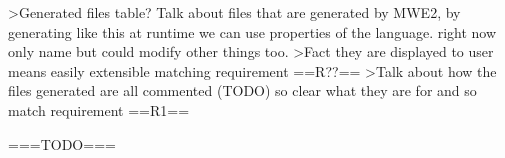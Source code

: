 \documentclass{article}
\begin{document}
>Generated files table? Talk about files that are generated by MWE2, by generating like this at runtime we can use properties of the language. right now only name but could modify other things too.
>Fact they are displayed to user means easily extensible matching requirement ==R??==
>Talk about how the files generated are all commented (TODO) so clear what they are for and so match requirement ==R1==



===TODO===
\end{document}
